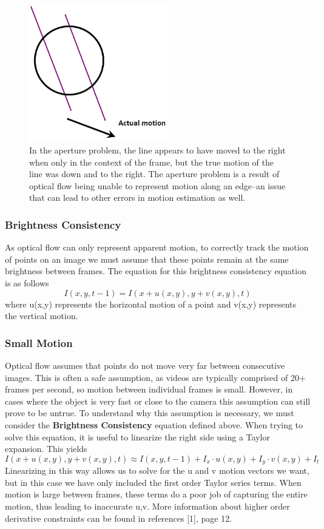 \documentclass{article}
\begin{document}
\begin{figure}[H]
\centering
\includegraphics[width=6cm]{aperture-problem}
\caption{In the aperture problem, the line appears to have moved to the right when only in the context of the frame, but the true motion of the line was down and to the right. The aperture problem is a result of optical flow being unable to represent motion along an edge--an issue that can lead to other errors in motion estimation as well.}
\end{figure}

 

\subsubsection{Brightness Consistency}
As optical flow can only represent apparent motion, to correctly track the motion of points on an image we must assume that these points remain at the same brightness between frames. The equation for this brightness consistency equation is as follows
\[ I(x,y,t-1) = I(x+u(x,y), y+ v(x,y), t) \]
where u(x,y) represents the horizontal motion of a point and v(x,y) represents the vertical motion. 

\subsubsection{Small Motion}
Optical flow assumes that points do not move very far between consecutive images. This is often a safe assumption, as videos are typically comprised of 20+ frames per second, so motion between individual frames is small. However, in cases where the object is very fast or close to the camera this assumption can still prove to be untrue. To understand why this assumption is necessary, we must consider the \textbf{Brightness Consistency} equation defined above. When trying to solve this equation, it is useful to linearize the right side using a Taylor expansion. This yields
\[ I(x + u(x,y),y + v(x,y),t) \approx I(x,y,t-1) + I_x \cdot u(x,y) + I_y \cdot v(x,y) + I_t \]
Linearizing in this way allows us to solve for the u and v motion vectors we want, but in this case we have only included the first order Taylor series terms. When motion is large between frames, these terms do a poor job of capturing the entire motion, thus leading to inaccurate u,v. More information about higher order derivative constraints can be found in references [1], page 12.
\end{document}
